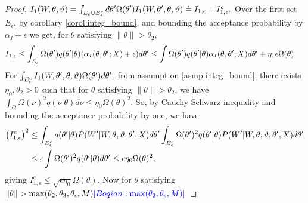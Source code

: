 \begin{proof}
$ I_1(W, \theta, \vartheta) = \int_{\E_\epsilon \cup \E_\epsilon^c} 
\hspace{-.0in} d\theta' \Omega(\theta')I_1(W,\theta',\theta,\vartheta) \assign I_{1,\epsilon} + I_{1,\epsilon}^c. \\
$
%
Over the first set $E_\epsilon$, by corollary \ref{corol:integ_bound}, and bounding
the acceptance probability by $\alpha_I + \epsilon$ we get, for $\theta$ satisfying $ \| \theta \| > \theta_2$,
\begin{align*}
  I_{1,\epsilon} & \leq \int_{E_\epsilon} \Omega(\theta')q(\theta' | \theta) (\alpha_I(\theta, \theta'; X) + \epsilon) d\theta' 
 \leq \int \Omega(\theta')q(\theta' | \theta) \alpha_I(\theta, \theta'; X) d\theta' + \eta_1 \epsilon \Omega(\theta).
\end{align*}
For $\int_{E_\epsilon^c} I_1(W, \theta', \theta, \vartheta) \Omega(\theta') d\theta'$, from assumption \ref{asmp:integ_bound}, there exists $\eta_0 , \theta_2 > 0$   such that for $\theta$ satisfying $ \| \theta \| > \theta_2$, we have
$\int_\Theta \Omega(\nu)^2 q(\nu | \theta)d\nu \leq \eta_0 \Omega(\theta)^2$.
So, by Cauchy-Schwarz inequality and bounding the acceptance probability by one, we have
\begin{align*}
  \left( I_{1,\epsilon}^c\right)^2 %
& \le \int_{\E_\epsilon^c} q(\theta' | \theta) P(W' |W, \theta, \vartheta, \theta', X)d\theta'  \int_{\E_\epsilon^c}  \Omega(\theta')^2 q(\theta' | \theta) P(W' |W, \theta, \vartheta, \theta', X)d\theta'   \\
& \le \epsilon \int  \Omega(\theta')^2 q(\theta' | \theta)d\theta' 
 \le \epsilon \eta_0 \Omega(\theta)^2 ,
\end{align*}
giving
$
I_{1,\epsilon}^c  \le \sqrt{\epsilon \eta_0 }\Omega(\theta) .
$
Now for $\theta$ satisfying $ \| \theta \| >\max(\theta_2, \theta_3, 
\theta_\epsilon, M) \textcolor{blue}{[Boqian: \max(\theta_2, \theta_\epsilon, M)]}$ 

\end{proof}
